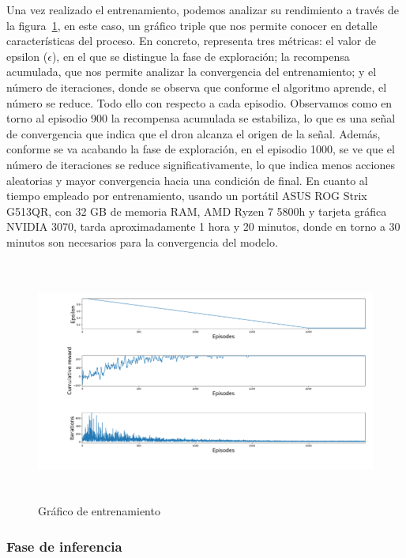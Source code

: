 Una vez realizado el entrenamiento, podemos analizar su rendimiento a través de la figura~\ref{fig:training_graph}, en este caso, un gráfico triple que nos permite conocer en detalle características del proceso. En concreto, representa tres métricas: el valor de epsilon ($\epsilon$), en el que se distingue la fase de exploración; la recompensa acumulada, que nos permite analizar la convergencia del entrenamiento; y el número de iteraciones, donde se observa que conforme el algoritmo aprende, el número se reduce. Todo ello con respecto a cada episodio. Observamos como en torno al episodio 900 la recompensa acumulada se estabiliza, lo que es una señal de convergencia que indica que el dron alcanza el origen de la señal. Además, conforme se va acabando la fase de exploración, en el episodio 1000, se ve que el número de iteraciones se reduce significativamente, lo que indica menos acciones aleatorias y mayor convergencia hacia una condición de final. En cuanto al tiempo empleado por entrenamiento, usando un portátil ASUS ROG Strix G513QR, con 32 GB de memoria RAM, AMD Ryzen 7 5800h y tarjeta gráfica NVIDIA 3070, tarda aproximadamente 1 hora y 20 minutos, donde en torno a 30 minutos son necesarios para la convergencia del modelo.\\

\begin{figure} [tp]
    \begin{center}
    \includegraphics[height=8cm]{imagenes/cap4/14_training_graph.png}
    \end{center}
    \caption[Gráfico de entrenamiento]{Gráfico de entrenamiento}
    \label{fig:training_graph}
\end{figure}

\subsubsection{Fase de inferencia}
\label{subsubsec:test}

